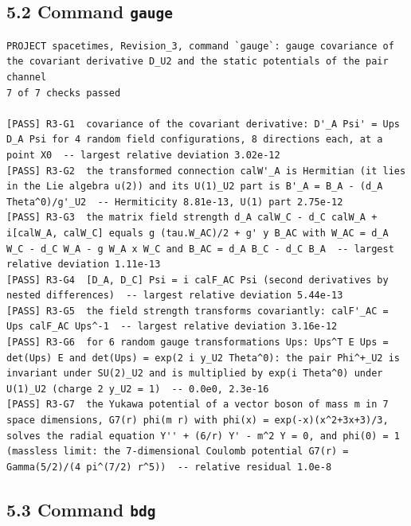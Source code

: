 \documentclass[
  10pt,
]{article}
\begin{document}
\hypertarget{command-gauge}{%
\subsection{\texorpdfstring{5.2 Command
\texttt{gauge}}{5.2 Command gauge}}\label{command-gauge}}

\begin{verbatim}
PROJECT spacetimes, Revision_3, command `gauge`: gauge covariance of the covariant derivative D_U2 and the static potentials of the pair channel
7 of 7 checks passed

[PASS] R3-G1  covariance of the covariant derivative: D'_A Psi' = Ups D_A Psi for 4 random field configurations, 8 directions each, at a point X0  -- largest relative deviation 3.02e-12
[PASS] R3-G2  the transformed connection calW'_A is Hermitian (it lies in the Lie algebra u(2)) and its U(1)_U2 part is B'_A = B_A - (d_A Theta^0)/g'_U2  -- Hermiticity 8.81e-13, U(1) part 2.75e-12
[PASS] R3-G3  the matrix field strength d_A calW_C - d_C calW_A + i[calW_A, calW_C] equals g (tau.W_AC)/2 + g' y B_AC with W_AC = d_A W_C - d_C W_A - g W_A x W_C and B_AC = d_A B_C - d_C B_A  -- largest relative deviation 1.11e-13
[PASS] R3-G4  [D_A, D_C] Psi = i calF_AC Psi (second derivatives by nested differences)  -- largest relative deviation 5.44e-13
[PASS] R3-G5  the field strength transforms covariantly: calF'_AC = Ups calF_AC Ups^-1  -- largest relative deviation 3.16e-12
[PASS] R3-G6  for 6 random gauge transformations Ups: Ups^T E Ups = det(Ups) E and det(Ups) = exp(2 i y_U2 Theta^0): the pair Phi^+_U2 is invariant under SU(2)_U2 and is multiplied by exp(i Theta^0) under U(1)_U2 (charge 2 y_U2 = 1)  -- 0.0e0, 2.3e-16
[PASS] R3-G7  the Yukawa potential of a vector boson of mass m in 7 space dimensions, G7(r) phi(m r) with phi(x) = exp(-x)(x^2+3x+3)/3, solves the radial equation Y'' + (6/r) Y' - m^2 Y = 0, and phi(0) = 1 (massless limit: the 7-dimensional Coulomb potential G7(r) = Gamma(5/2)/(4 pi^(7/2) r^5))  -- relative residual 1.0e-8
\end{verbatim}

\hypertarget{command-bdg}{%
\subsection{\texorpdfstring{5.3 Command
\texttt{bdg}}{5.3 Command bdg}}\label{command-bdg}}
\end{document}
